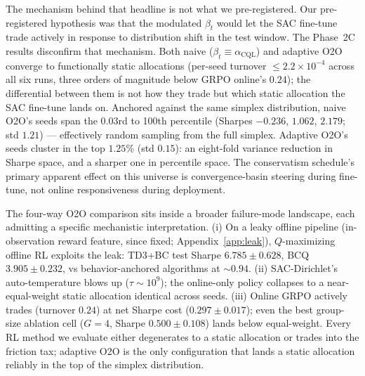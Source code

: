 The mechanism behind that headline is not what we pre-registered. Our
pre-registered hypothesis was that the modulated $\beta_t$ would let
the SAC fine-tune trade actively in response to distribution shift in
the test window. The Phase~2C results disconfirm that mechanism. Both
naive ($\beta_t \equiv \alpha_{\mathrm{CQL}}$) and adaptive O2O
converge to functionally static allocations (per-seed turnover
$\le 2.2\!\times\!10^{-4}$ across all six runs, three orders of
magnitude below GRPO online's $0.24$); the differential between them
is not how they trade but which static allocation the SAC fine-tune
lands on. Anchored against the same simplex distribution, naive O2O's
seeds span the 0.03rd to 100th percentile (Sharpes $-0.236$, $1.062$,
$2.179$; std $1.21$) --- effectively random sampling from the full
simplex. Adaptive O2O's seeds cluster in the top $1.25\%$ (std
$0.15$): an eight-fold variance reduction in Sharpe space, and a
sharper one in percentile space. The conservatism schedule's
primary apparent effect on this universe is convergence-basin steering
during fine-tune, not online responsiveness during deployment.

The four-way O2O comparison sits inside a broader failure-mode
landscape, each admitting a specific mechanistic interpretation. (i) On a leaky
offline pipeline (in-observation reward feature, since fixed;
Appendix~\ref{app:leak}), $Q$-maximizing offline RL exploits the leak:
TD3+BC test Sharpe $6.785 \pm 0.628$, BCQ $3.905 \pm 0.232$, vs
behavior-anchored algorithms at $\sim\!0.94$. (ii) SAC-Dirichlet's
auto-temperature blows up ($\tau \sim 10^9$); the online-only policy
collapses to a near-equal-weight static allocation identical across
seeds. (iii) Online GRPO actively trades (turnover $0.24$) at net
Sharpe cost ($0.297 \pm 0.017$); even the best group-size ablation
cell ($G{=}4$, Sharpe $0.500 \pm 0.108$) lands below equal-weight.
Every RL method we evaluate either degenerates to a static allocation
or trades into the friction tax; adaptive O2O is the only
configuration that lands a static allocation reliably in the top of
the simplex distribution.

